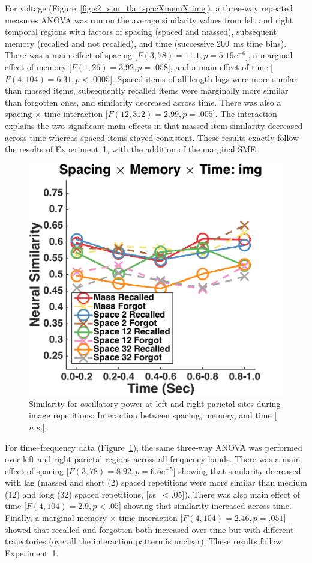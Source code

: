 For voltage (Figure~\ref{fig:s2_sim_tla_spacXmemXtime}), a three-way repeated measures ANOVA was run on the average similarity values from left and right temporal regions with factors of spacing (spaced and massed), subsequent memory (recalled and not recalled), and time (successive 200~ms time bins).  There was a main effect of spacing [$F(3,78)=11.1, p=5.19e^{-6}$], a marginal effect of memory [$F(1,26)=3.92, p=.058$], and a main effect of time [$F(4,104)=6.31, p<.0005$].  Spaced items of all length lags were more similar than massed items, subsequently recalled items were marginally more similar than forgotten ones, and similarity decreased across time.  There was also a spacing $\times$ time interaction [$F(12,312)=2.99, p=.005$].  The interaction explains the two significant main effects in that massed item similarity decreased across time whereas spaced items stayed consistent.  These results exactly follow the results of Experiment~1, with the addition of the marginal SME.

\begin{figure}[H]
  \centering
  \includegraphics[width=.40\textwidth]{./figs/exp2/similarity_spacXmemXtime_img_pow_LPSRPS_0to200_200to400_400to600_600to800_800to1000_kaiser_cosine}
  \caption{Similarity for oscillatory power at left and right parietal sites during image repetitions: Interaction between spacing, memory, and time [$n.s.$].}
  \label{fig:s2_sim_pow_spacXmemXtime}
\end{figure}

For time--frequency data (Figure~\ref{fig:s2_sim_pow_spacXmemXtime}), the same three-way ANOVA was performed over left and right parietal regions across all frequency bands.
There was a main effect of spacing [$F(3,78)=8.92, p=6.5e^{-5}$] showing that similarity decreased with lag (massed and short (2) spaced repetitions were more similar than medium (12) and long (32) spaced repetitions, [$p$s~$<.05$]).  There was also main effect of time [$F(4,104)=2.9, p<.05$] showing that similarity increased across time.  Finally, a marginal memory $\times$ time interaction [$F(4,104)=2.46, p=.051$] showed that recalled and forgotten both increased over time but with different trajectories (overall the interaction pattern is unclear).  These results follow Experiment~1.

